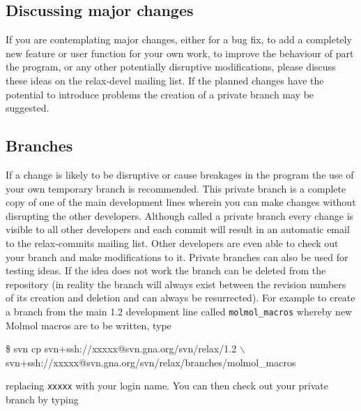 \subsection{Discussing major changes}

If you are contemplating major changes, either for a bug fix, to add a completely new feature or user function for your own work, to improve the behaviour of part the program, or any other potentially disruptive modifications, please discuss these ideas on the rela\mbox{x-d}evel mailing list.  If the planned changes have the potential to introduce problems the creation of a private branch may be suggested.



\subsection{Branches}

If a change is likely to be disruptive or cause breakages in the program the use of your own temporary branch is recommended.  This private branch is a complete copy of one of the main development lines wherein you can make changes without disrupting the other developers.  Although called a private branch every change is visible to all other developers and each commit will result in an automatic email to the relax-commits mailing list.  Other developers are even able to check out your branch and make modifications to it.  Private branches can also be used for testing ideas.  If the idea does not work the branch can be deleted from the repository (in reality the branch will always exist between the revision numbers of its creation and deletion and can always be resurrected).  For example to create a branch from the main 1.2 development line called \texttt{molmol\_macros} whereby new Molmol macros are to be written, type

\begin{exampleenv}
\$ svn cp svn+ssh://xxxxx@svn.gna.org/svn/relax/1.2 $\backslash$ \\
 svn+ssh://xxxxx@svn.gna.org/svn/relax/branches/molmol\_macros
\end{exampleenv}

replacing \texttt{xxxxx} with your login name.  You can then check out your private branch by typing


